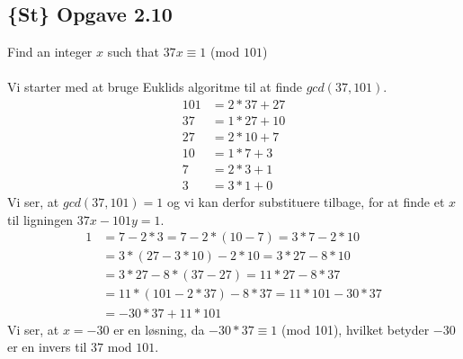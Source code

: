 \documentclass[12pt]{article}
\begin{document}
\subsection*{\{\textbf{St}\} Opgave 2.10}
Find an integer $x$ such that $37x\equiv 1$ (mod $101$)\\
\\
Vi starter med at bruge Euklids algoritme til at finde $gcd(37,101)$.
\begin{align*}
101&=2*37+27 \\
37&=1*27+10 \\
27&=2*10+7 \\
10&=1*7+3 \\
7&=2*3+1 \\
3&=3*1+0
\end{align*}
Vi ser, at $gcd(37,101) = 1$ og vi kan derfor substituere tilbage, for at finde et $x$ til ligningen  $37x-101y=1$.\\
\begin{align*}
1&=7-2*3=7-2*(10-7)=3*7-2*10 \\
&=3*(27-3*10)-2*10 = 3*27-8*10 \\
&=3*27-8*(37-27)=11*27-8*37 \\
&=11*(101-2*37)-8*37=11*101-30*37 \\
&=-30*37+11*101  
\end{align*}
Vi ser, at $x=-30$ er en løsning, da $-30*37 \equiv 1$ (mod 101), hvilket betyder $-30$ er en invers til $37$ mod $101$.
  
\end{document}
